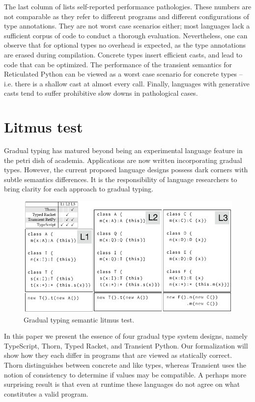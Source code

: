 \documentclass[acmsmall, anonymous, authordraft, review]{acmart} %
\begin{document}
The last column of  lists self-reported performance pathologies.
These numbers are not comparable as they refer to different programs and
different configurations of type annotations. They are not worst case scenarios
either; most languages lack a sufficient corpus of code to conduct a thorough
evaluation.  Nevertheless, one can observe that for optional types no overhead
is expected, as the type annotations are erased during compilation. Concrete
types insert efficient casts, and lead to code that can be optimized.  The
performance of the transient semantics for Reticulated Python can be viewed as a
worst case scenario for concrete types -- i.e. there is a shallow cast at almost
every call. Finally, languages with generative casts tend to suffer prohibitive
slow downs in pathological cases.


\section{Litmus test}\label{litmustest}

Gradual typing has matured beyond being an experimental language feature in
the petri dish of academia. Applications are now written incorporating
gradual types.  However, the current proposed language designs possess dark
corners with subtle semantics differences. It is the responsibility of
language researchers to bring clarity for each approach to gradual typing.

\begin{figure}[!h]
	\includegraphics[width=.9\columnwidth]{../figures/litm}
	\caption{Gradual typing semantic litmus test.}\label{litmus}
\end{figure}

\noindent In this paper we present the essence of four gradual type
system designs, namely TypeScript, Thorn, Typed Racket, and Transient Python.
Our formalization will show how they each differ in programs that are viewed as
statically correct. Thorn distinguishes between concrete and like types,
whereas Transient uses the notion of consistency to determine if values may be
compatible. A perhaps more surprising result is that even at runtime these
languages do not agree on what constitutes a valid program. 
\end{document}
